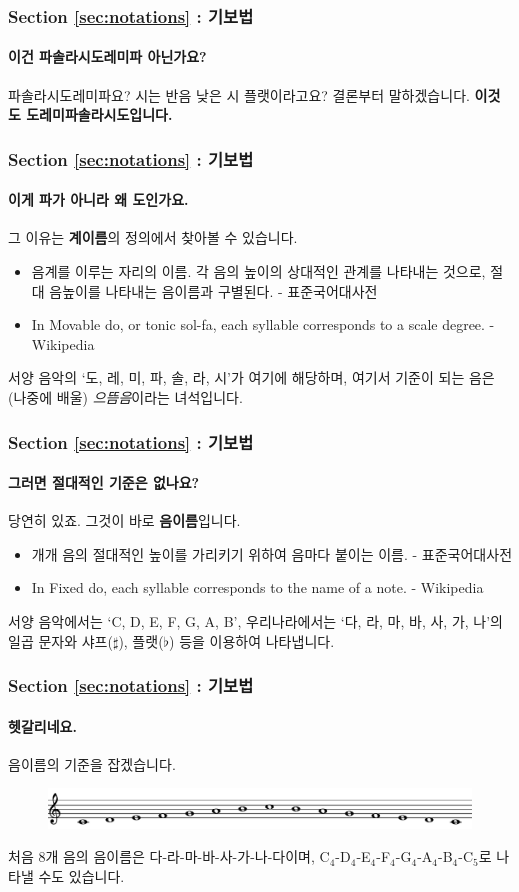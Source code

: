 \documentclass{beamer}
\begin{document}
	\begin{frame}
		\frametitle{Section \ref{sec:notations} : 기보법}
		\framesubtitle{이건 파솔라시도레미파 아닌가요?}
		파솔라시도레미파요? 시는 반음 낮은 시 플랫이라고요? 결론부터 말하겠습니다. \bf 이것도 도레미파솔라시도입니다. 	
	\end{frame}
	
	\begin{frame}
		\frametitle{Section \ref{sec:notations} : 기보법}
		\framesubtitle{이게 파가 아니라 왜 도인가요.}
		그 이유는 {\bf 계이름}의 정의에서 찾아볼 수 있습니다.
		\begin{definition}
			\begin{itemize}
				\item 음계를 이루는 자리의 이름. 각 음의 높이의 상대적인 관계를 나타내는 것으로, 절대 음높이를 나타내는 음이름과 구별된다. - 표준국어대사전
				\item In Movable do, or tonic sol-fa, each syllable corresponds to a scale degree. - Wikipedia
			\end{itemize}
		\end{definition}
		서양 음악의 `도, 레, 미, 파, 솔, 라, 시'가 여기에 해당하며, 여기서 기준이 되는 음은 (나중에 배울) {\it 으뜸음}이라는 녀석입니다.
	\end{frame}
	
	\begin{frame}
		\frametitle{Section \ref{sec:notations} : 기보법}
		\framesubtitle{그러면 절대적인 기준은 없나요?}
		당연히 있죠. 그것이 바로 {\bf 음이름}입니다.
		\begin{definition}
			\begin{itemize}
				\item 개개 음의 절대적인 높이를 가리키기 위하여 음마다 붙이는 이름. - 표준국어대사전
				\item In Fixed do, each syllable corresponds to the name of a note. - Wikipedia
			\end{itemize}
		\end{definition}
		서양 음악에서는 `C, D, E, F, G, A, B', 우리나라에서는 `다, 라, 마, 바, 사, 가, 나'의 일곱 문자와 샤프($\sharp$), 플랫($\flat$) 등을 이용하여 나타냅니다.
	\end{frame}
	
	\begin{frame}
		\frametitle{Section \ref{sec:notations} : 기보법}
		\framesubtitle{헷갈리네요.}
		\flushleft
		음이름의 기준을 잡겠습니다.
		\begin{figure}[!h]
			\centering
			{\includegraphics[width=\textwidth]{res/pdf/4/syllable/doremi.pdf}}
		\end{figure}
		처음 8개 음의 음이름은 다-라-마-바-사-가-나-다이며, C$_4$-D$_4$-E$_4$-F$_4$-G$_4$-A$_4$-B$_4$-C$_5$로 나타낼 수도 있습니다.
	\end{frame}
	
\end{document}
